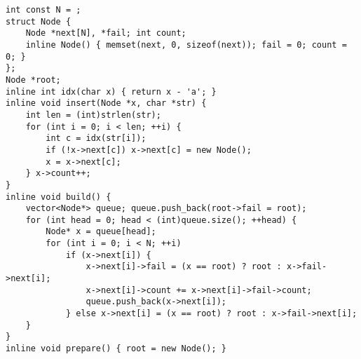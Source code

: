 \begin{lstlisting}
int const N = ;
struct Node {
	Node *next[N], *fail; int count;
	inline Node() { memset(next, 0, sizeof(next)); fail = 0; count = 0; }
};
Node *root;
inline int idx(char x) { return x - 'a'; }
inline void insert(Node *x, char *str) {
	int len = (int)strlen(str);
	for (int i = 0; i < len; ++i) {
		int c = idx(str[i]);
		if (!x->next[c]) x->next[c] = new Node();
		x = x->next[c];
	} x->count++;
}
inline void build() {
	vector<Node*> queue; queue.push_back(root->fail = root);
	for (int head = 0; head < (int)queue.size(); ++head) {
		Node* x = queue[head];
		for (int i = 0; i < N; ++i)
			if (x->next[i]) {
				x->next[i]->fail = (x == root) ? root : x->fail->next[i];
				x->next[i]->count += x->next[i]->fail->count;
				queue.push_back(x->next[i]);
			} else x->next[i] = (x == root) ? root : x->fail->next[i];
	}
}
inline void prepare() { root = new Node(); }
\end{lstlisting}
